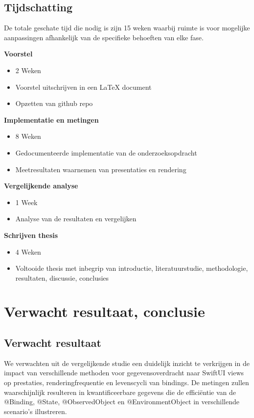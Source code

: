 \subsection{Tijdschatting}
De totale geschate tijd die nodig is zijn 15 weken waarbij ruimte is voor mogelijke aanpassingen afhankelijk van de specifieke behoeften van elke fase.

\textbf{Voorstel}
\begin{itemize}
    \item {2 Weken}
    \item {Voorstel uitschrijven in een LaTeX document}
    \item {Opzetten van github repo}
\end{itemize}

\textbf{Implementatie en metingen}
\begin{itemize}
    \item {8 Weken}
    \item {Gedocumenteerde implementatie van de onderzoeksopdracht}
    \item {Meetresultaten waarnemen van presentaties en rendering}
\end{itemize}

\textbf{Vergelijkende analyse}
\begin{itemize}
    \item {1 Week}
    \item {Analyse van de resultaten en vergelijken}
\end{itemize}

\textbf{Schrijven thesis}
\begin{itemize}
    \item {4 Weken}
    \item {Voltooide thesis met inbegrip van introductie, literatuurstudie, methodologie, resultaten, discussie, conclusies}
\end{itemize}


\section{Verwacht resultaat, conclusie}
\label{sec:verwachte_resultaten}


\subsection{Verwacht resultaat}
We verwachten uit de vergelijkende studie een duidelijk inzicht te verkrijgen in de impact van verschillende methoden voor gegevensoverdracht naar SwiftUI views op prestaties, renderingfrequentie en levenscycli van bindings. De metingen zullen waarschijnlijk resulteren in kwantificeerbare gegevens die de efficiëntie van de @Binding, @State, @ObservedObject en @EnvironmentObject in verschillende scenario's illustreren.

